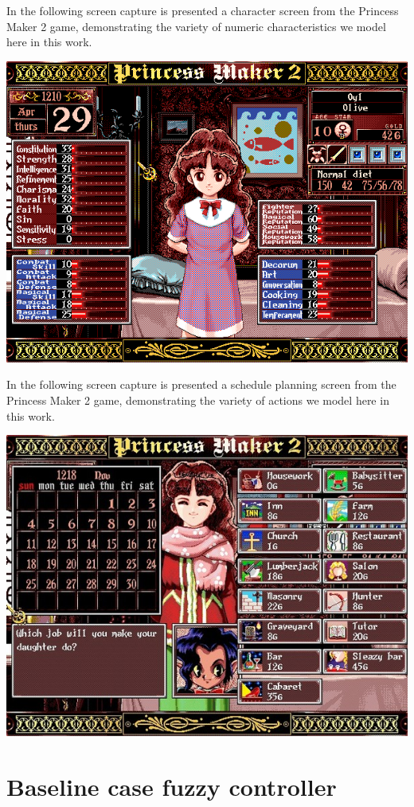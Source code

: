 \documentclass[12pt, a4paper]{report}
\begin{document}
	In the following screen capture is presented a character screen from the Princess Maker 2 game, demonstrating the variety of numeric characteristics we model here in this work.
	
	\includegraphics*[width=\textwidth, keepaspectratio=true]{code/pm2_attributes.png}
	
	In the following screen capture is presented a schedule planning screen from the Princess Maker 2 game, demonstrating the variety of actions we model here in this work.
	
	\includegraphics*[width=\textwidth, keepaspectratio=true]{code/pm2_actions.png}
		
	\chapter{Baseline case fuzzy controller}\label{appendix::baseline-case-fuzzy-controller}
	
	
	
\end{document}
